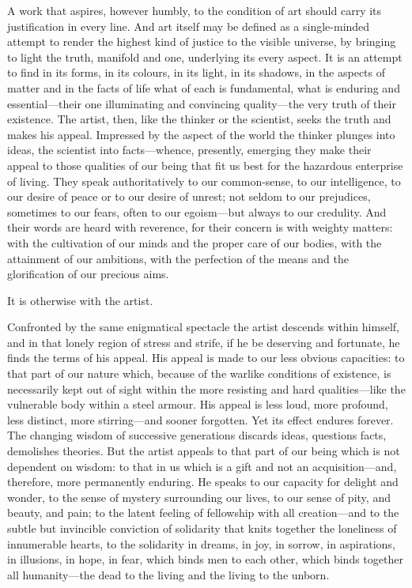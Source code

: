 A work that aspires, however humbly, to the condition of art should
carry its justification in every line. And art itself may be defined as
a single-minded attempt to render the highest kind of justice to the
visible universe, by bringing to light the truth, manifold and one,
underlying its every aspect. It is an attempt to find in its forms, in
its colours, in its light, in its shadows, in the aspects of matter and
in the facts of life what of each is fundamental, what is enduring and
essential---their one illuminating and convincing quality---the very
truth of their existence. The artist, then, like the thinker or the
scientist, seeks the truth and makes his appeal. Impressed by the aspect
of the world the thinker plunges into ideas, the scientist into
facts---whence, presently, emerging they make their appeal to those
qualities of our being that fit us best for the hazardous enterprise of
living. They speak authoritatively to our common-sense, to our
intelligence, to our desire of peace or to our desire of unrest; not
seldom to our prejudices, sometimes to our fears, often to our
egoism---but always to our credulity. And their words are heard with
reverence, for their concern is with weighty matters: with the
cultivation of our minds and the proper care of our bodies, with the
attainment of our ambitions, with the perfection of the means and the
glorification of our precious aims.

It is otherwise with the artist.

Confronted by the same enigmatical spectacle the artist descends within
himself, and in that lonely region of stress and strife, if he be
deserving and fortunate, he finds the terms of his appeal. His appeal is
made to our less obvious capacities: to that part of our nature which,
because of the warlike conditions of existence, is necessarily kept out
of sight within the more resisting and hard qualities---like the
vulnerable body within a steel armour. His appeal is less loud, more
profound, less distinct, more stirring---and sooner forgotten. Yet its
effect endures forever. The changing wisdom of successive generations
discards ideas, questions facts, demolishes theories. But the artist
appeals to that part of our being which is not dependent on wisdom: to
that in us which is a gift and not an acquisition---and, therefore, more
permanently enduring. He speaks to our capacity for delight and wonder,
to the sense of mystery surrounding our lives, to our sense of pity, and
beauty, and pain; to the latent feeling of fellowship with all
creation---and to the subtle but invincible conviction of solidarity
that knits together the loneliness of innumerable hearts, to the
solidarity in dreams, in joy, in sorrow, in aspirations, in illusions,
in hope, in fear, which binds men to each other, which binds together
all humanity---the dead to the living and the living to the unborn.

